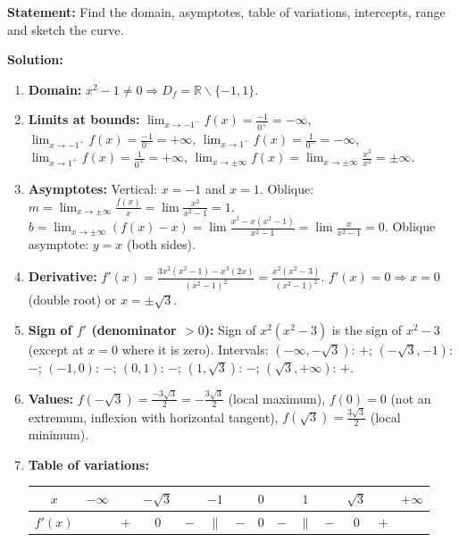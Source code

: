 \documentclass[11pt]{article}
\def\setminus{\mathbin{\backslash}}\let\smallsetminus\setminus
\begin{document}
\begin{exoresolu}[Complete analysis of \(f(x)=\dfrac{x^3}{x^2-1}\)]
\textbf{Statement:} Find the domain, asymptotes, table of variations, intercepts, range and sketch the curve.

\textbf{Solution:}
\begin{enumerate}
  \item \textbf{Domain:} \(x^2-1\neq0 \Rightarrow D_f = \mathbb{R}\setminus\{-1,1\}\).
  \item \textbf{Limits at bounds:}
    \(\lim_{x\to -1^-} f(x) = \frac{-1}{0^+} = -\infty\),
    \(\lim_{x\to -1^+} f(x) = \frac{-1}{0^-} = +\infty\),
    \(\lim_{x\to 1^-} f(x) = \frac{1}{0^-} = -\infty\),
    \(\lim_{x\to 1^+} f(x) = \frac{1}{0^+} = +\infty\),
    \(\lim_{x\to\pm\infty} f(x) = \lim_{x\to\pm\infty} \frac{x^3}{x^2} = \pm\infty\).
  \item \textbf{Asymptotes:}
    Vertical: \(x=-1\) and \(x=1\).
    Oblique: \(m=\lim_{x\to\pm\infty} \frac{f(x)}{x} = \lim \frac{x^2}{x^2-1}=1\).
    \(b=\lim_{x\to\pm\infty} (f(x)-x) = \lim \frac{x^3 - x(x^2-1)}{x^2-1} = \lim \frac{x}{x^2-1}=0\).
    Oblique asymptote: \(y=x\) (both sides).
  \item \textbf{Derivative:}
    \(f'(x) = \frac{3x^2(x^2-1) - x^3(2x)}{(x^2-1)^2} = \frac{x^2(x^2-3)}{(x^2-1)^2}\).
    \(f'(x)=0 \Rightarrow x=0\) (double root) or \(x=\pm\sqrt{3}\).
  \item \textbf{Sign of \(f'\) (denominator \(>0\)):}
    Sign of \(x^2(x^2-3)\) is the sign of \(x^2-3\) (except at \(x=0\) where it is zero).
    Intervals:
    \((-\infty,-\sqrt{3})\): \(+\);
    \((-\sqrt{3},-1)\): \(-\);
    \((-1,0)\): \(-\);
    \((0,1)\): \(-\);
    \((1,\sqrt{3})\): \(-\);
    \((\sqrt{3},+\infty)\): \(+\).
  \item \textbf{Values:}
    \(f(-\sqrt{3}) = \frac{-3\sqrt{3}}{2} = -\frac{3\sqrt{3}}{2}\) (local maximum),
    \(f(0)=0\) (not an extremum, inflexion with horizontal tangent),
    \(f(\sqrt{3}) = \frac{3\sqrt{3}}{2}\) (local minimum).
  \item \textbf{Table of variations:}
    \begin{center}
    \begin{tabular}{|c|ccccccccccccc|}\hline
    \(x\) & \(-\infty\) & & \(-\sqrt{3}\) & & \(-1\) & & \(0\) & & \(1\) & & \(\sqrt{3}\) & & \(+\infty\) \\ \hline
    \(f'(x)\) & & \(+\) & \(0\) & \(-\) & \(\parallel\) & \(-\) & \(0\) & \(-\) & \(\parallel\) & \(-\) & \(0\) & \(+\) & \\ \hline

\end{tabular}
\end{center}
\end{enumerate}
\end{exoresolu}
\end{document}

